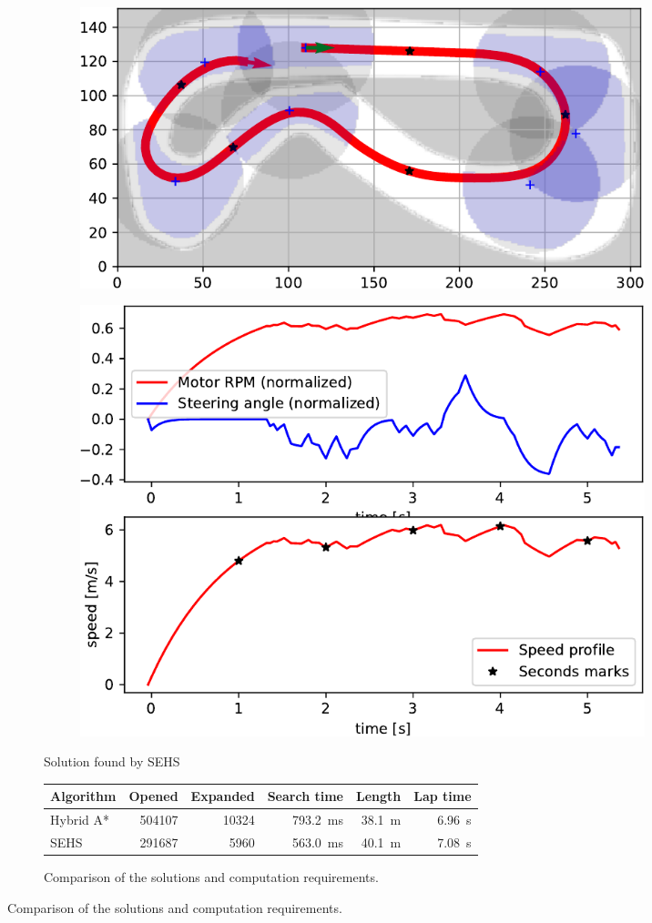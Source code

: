 \begin{figure}[!tbp]
	\begin{subfigure}[t]{\textwidth}
		\begin{subfigure}[c]{0.59\textwidth}
			\includegraphics[width=\textwidth]{../img/experiments/porto-sehs-trajectory}
		\end{subfigure}
		\hfill
		\begin{subfigure}[c]{0.4\textwidth}
			\includegraphics[width=\textwidth]{../img/experiments/porto-sehs-actuators}
		\end{subfigure}
		\caption{Solution found by SEHS}
		\label{fig:solution_porto-sehs}
	\end{subfigure}

	\vspace{0.75cm}
	
	\begin{subfigure}[t]{\textwidth}
		\centering
		\begin{tabular}{l r r r r r}%
			\toprule
			Algorithm & Opened & Expanded & Search time & Length & Lap time \\
			\midrule
			Hybrid A* & \num{504107} & \num{10324} & \SI{793.2}{\milli\second} & \SI{38.1}{\meter} & \bftab \SI{6.96}{\second} \\
			SEHS & \bftab \num{291687} & \bftab \num{5960} & \bftab \SI{563.0}{\milli\second} & \SI{40.1}{\meter} & \SI{7.08}{\second} \\
			\bottomrule
		\end{tabular}
		\caption{Comparison of the solutions and computation requirements.}
		\label{table:porto}
	\end{subfigure}


\end{figure}
